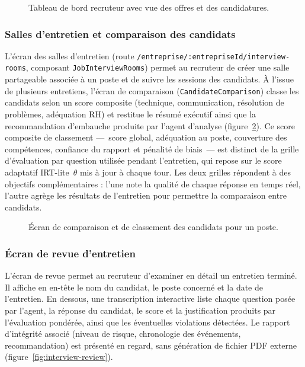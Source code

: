 \begin{figure}[H]
  \centering
  \caption{Tableau de bord recruteur avec vue des offres et des candidatures.}
  \label{fig:recruiter-dashboard}
\end{figure}

\subsubsection{Salles d'entretien et comparaison des candidats}

L'écran des salles d'entretien (route \texttt{/entreprise/:entrepriseId/interview-rooms},
composant \texttt{JobInterviewRooms}) permet au recruteur de créer une salle partageable
associée à un poste et de suivre les sessions des candidats. À l'issue de plusieurs entretiens,
l'écran de comparaison (\texttt{CandidateComparison}) classe les candidats selon un score
composite (technique, communication, résolution de problèmes, adéquation RH) et restitue le
résumé exécutif ainsi que la recommandation d'embauche produite par l'agent d'analyse
(figure~\ref{fig:candidate-comparison}).
Ce score composite de classement ---~score global, adéquation au poste, couverture des compétences, confiance du rapport et pénalité de biais~--- est distinct de la grille d'évaluation par question utilisée pendant l'entretien, qui repose sur le score adaptatif IRT-lite~$\theta$ mis à jour à chaque tour. Les deux grilles répondent à des objectifs complémentaires : l'une note la qualité de chaque réponse en temps réel, l'autre agrège les résultats de l'entretien pour permettre la comparaison entre candidats.

\begin{figure}[H]
  \centering
  \caption{Écran de comparaison et de classement des candidats pour un poste.}
  \label{fig:candidate-comparison}
\end{figure}

\subsubsection{Écran de revue d'entretien}

L'écran de revue permet au recruteur d'examiner en détail un entretien terminé. Il affiche
en en-tête le nom du candidat, le poste concerné et la date de l'entretien. En dessous, une
transcription interactive liste chaque question posée par l'agent, la réponse du candidat,
le score et la justification produits par l'évaluation pondérée, ainsi que les éventuelles
violations détectées. Le rapport d'intégrité associé (niveau de risque, chronologie des
événements, recommandation) est présenté en regard, sans génération de fichier PDF externe
(figure~\ref{fig:interview-review}).

